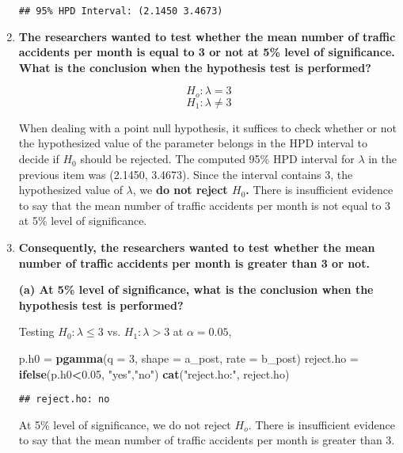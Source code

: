 \documentclass[]{article}
\newenvironment{Shaded}{\begin{snugshade}}{\end{snugshade}}
\newcommand{\AttributeTok}[1]{\textcolor[rgb]{0.13,0.29,0.53}{#1}}
\newcommand{\DecValTok}[1]{\textcolor[rgb]{0.00,0.00,0.81}{#1}}
\newcommand{\FloatTok}[1]{\textcolor[rgb]{0.00,0.00,0.81}{#1}}
\newcommand{\FunctionTok}[1]{\textcolor[rgb]{0.13,0.29,0.53}{\textbf{#1}}}
\newcommand{\NormalTok}[1]{#1}
\newcommand{\OtherTok}[1]{\textcolor[rgb]{0.56,0.35,0.01}{#1}}
\newcommand{\SpecialCharTok}[1]{\textcolor[rgb]{0.81,0.36,0.00}{\textbf{#1}}}
\newcommand{\StringTok}[1]{\textcolor[rgb]{0.31,0.60,0.02}{#1}}
\begin{document}
\begin{enumerate}
\begin{verbatim}
## 95% HPD Interval: (2.1450 3.4673)
\end{verbatim}

\item \textbf{The researchers wanted to test whether the mean number of traffic accidents per month is equal to 3 or not at 5\% level of significance. What is the conclusion when the hypothesis test is performed?}

\[
H_o: \lambda = 3
\]
\[
H_1: \lambda \neq 3
\]

When dealing with a point null hypothesis, it suffices to check whether or not the hypothesized value of the parameter belongs in the HPD interval to decide if $H_0$ should be rejected. The computed 95\% HPD interval for $\lambda$ in the previous item was (2.1450, 3.4673). Since the interval contains 3, the hypothesized value of $\lambda$, we \textbf{do not reject $H_0$.} There is insufficient evidence to say that the mean number of traffic accidents per month is not equal to 3 at 5\% level of significance. 


\item \textbf{Consequently, the researchers wanted to test whether the mean number of traffic
accidents per month is greater than 3 or not.}

\textbf{(a) At 5\% level of significance, what is the conclusion when the hypothesis test is
performed?}

Testing $H_0: \lambda \leq 3$ vs. $H_1: \lambda > 3$ at $\alpha = 0.05$,

\begin{Shaded}
\begin{Highlighting}[]
\NormalTok{p.h0 }\OtherTok{=} \FunctionTok{pgamma}\NormalTok{(}\AttributeTok{q =} \DecValTok{3}\NormalTok{, }\AttributeTok{shape =}\NormalTok{ a\_post, }\AttributeTok{rate =}\NormalTok{ b\_post)}
\NormalTok{reject.ho }\OtherTok{=} \FunctionTok{ifelse}\NormalTok{(p.h0}\SpecialCharTok{\textless{}}\FloatTok{0.05}\NormalTok{, }\StringTok{"yes"}\NormalTok{,}\StringTok{"no"}\NormalTok{)}
\FunctionTok{cat}\NormalTok{(}\StringTok{"reject.ho:"}\NormalTok{, reject.ho)}
\end{Highlighting}
\end{Shaded}

\begin{verbatim}
## reject.ho: no
\end{verbatim}
\hfill
At 5\% level of significance, we do not reject $H_o$. There is insufficient evidence to say that the mean number of traffic accidents per month is greater than 3.


\end{enumerate}
\end{document}
